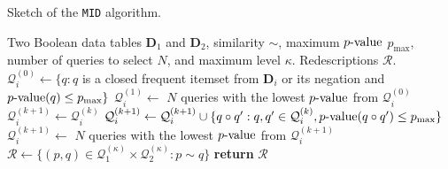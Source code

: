 \documentclass{article}
\newcommand{\algname}[1]{\texttt{#1}}
\newcommand{\Table}{\mathbf{D}}
\newcommand{\Queries}{\mathcal{Q}}
\newcommand{\query}{q}
\newcommand{\lquery}{p}
\newcommand{\rquery}{q}
\newcommand{\similar}{\sim}
\newcommand{\lop}{\circ}
\newcommand{\pvalue}{\ensuremath{p\text{\nobreakdash-value}}\xspace}
\newcommand{\algMID}{\algname{MID}\xspace}
\begin{document}
\begin{algorithm}[tb]
\caption{Sketch of the \algMID{} algorithm.}
  \label{alg:MID}
\begin{algorithmic}[1]
\small
  \Require Two Boolean data tables $\Table_1$ and $\Table_2$, similarity $\similar$, maximum \pvalue{} $p_{\max}$, number of queries to select $N$, and maximum level $\kappa$.
  \Ensure Redescriptions $\mathcal{R}$.
   \State $\Queries^{(0)}_i \gets \{ \query : \query$ is a closed frequent itemset from $\Table_i$ or its negation and $ \pvalue(\query) \leq p_{\max}\}$ \label{alg:MID:mine} %
   \State $\Queries^{(1)}_i \gets$  $N$ queries with the lowest \pvalue from $\Queries^{(0)}_i$ 
     \State $\Queries^{(k+1)}_i \gets \Queries^{(k)}_i$
     \For{operator $\lop \in \{\land, \lor\}$} %
        \State $\Queries^{(k+1)}_i \gets \Queries^{(k+1)}_i \cup \{ \query \lop \query' : \query, \query' \in \Queries^{(k)}_i, \pvalue(\query \lop \query') \leq p_{\max}\}$ \label{alg:MID:combine}
  \EndFor
   \State $\Queries^{(k+1)}_i \gets$  $N$ queries with the lowest \pvalue from $\Queries^{(k+1)}_i$ \label{alg:MID:filter}
  \EndFor
  \EndFor
  \State $\mathcal{R} \gets \{(\lquery, \rquery) \in \Queries^{(\kappa)}_1 \times \Queries^{(\kappa)}_2  : \lquery \similar \rquery\}$ \label{alg:MID:pair} %
  \State \textbf{return} $\mathcal{R}$
\end{algorithmic}
\end{algorithm}
\end{document}
